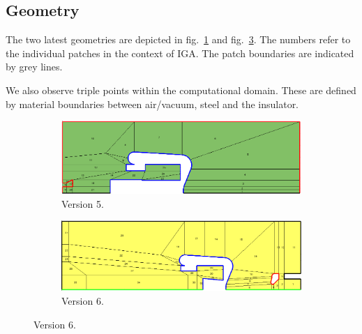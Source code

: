 \subsection{Geometry}
The two latest geometries are depicted in fig.~\ref{fig:geometry_v5} and fig.~\ref{fig:geometry_v6}. The numbers refer to the individual patches in the context of IGA. The patch boundaries are indicated by grey lines.

We also observe triple points within the computational domain. These are defined by material boundaries between air/vacuum, steel and the insulator.

\begin{center}
\begin{figure}[H]
   \begin{subfigure}{0.45\textwidth}
      \includegraphics[width=\textwidth]{fig/geometry_v5}
      \caption{Version 5.}
      \label{fig:geometry_v5}
   \end{subfigure}
   \begin{subfigure}{0.45\textwidth}
      \includegraphics[width=\textwidth]{fig/geometry_v6}
      \caption{Version 6.}
      \label{fig:geometry_v6}
   \end{subfigure}
\end{figure}
\end{center}

%       
%
%       

